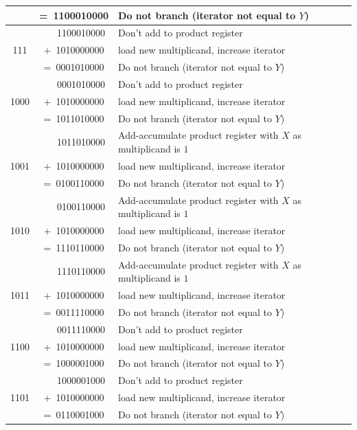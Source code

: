 \documentclass[a4paper]{report}
\begin{document}
\begin{center}
\begin{longtable}{|c|c|l|}
		         &  =~1100010000 & Do not branch (iterator not equal to $Y$) \\
		\hline                  
		         & ~~~1100010000 & Don't add to product register \\
		111      &  +~1010000000 & load new multiplicand, increase iterator \\
		         &  =~0001010000 & Do not branch (iterator not equal to $Y$) \\
		\hline                  
		         & ~~~0001010000 & Don't add to product register \\
		1000     &  +~1010000000 & load new multiplicand, increase iterator \\
		         &  =~1011010000 & Do not branch (iterator not equal to $Y$) \\
		\hline                  
		         & ~~~1011010000 & Add-accumulate product register with $X$ as multiplicand is $1$ \\
		1001     &  +~1010000000 & load new multiplicand, increase iterator \\
		         &  =~0100110000 & Do not branch (iterator not equal to $Y$) \\
		\hline \hline           
		         & ~~~0100110000 & Add-accumulate product register with $X$ as multiplicand is $1$ \\
		1010     &  +~1010000000 & load new multiplicand, increase iterator \\
		         &  =~1110110000 & Do not branch (iterator not equal to $Y$) \\
		\hline                  
		         & ~~~1110110000 & Add-accumulate product register with $X$ as multiplicand is $1$ \\
		1011     &  +~1010000000 & load new multiplicand, increase iterator \\
		         &  =~0011110000 & Do not branch (iterator not equal to $Y$) \\
		\hline                  
		         & ~~~0011110000 & Don't add to product register \\
		1100     &  +~1010000000 & load new multiplicand, increase iterator \\
		         &  =~1000001000 & Do not branch (iterator not equal to $Y$) \\
		\hline                  
		         & ~~~1000001000 & Don't add to product register \\
		1101     &  +~1010000000 & load new multiplicand, increase iterator \\
		         &  =~0110001000 & Do not branch (iterator not equal to $Y$) \\

\end{longtable}
\end{center}
\end{document}
